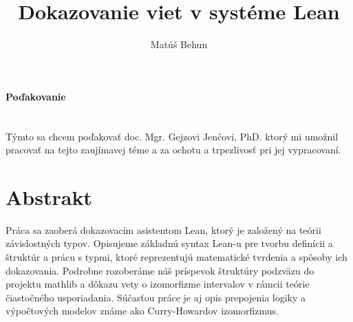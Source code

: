 \documentclass[a4paper,10pt,oneside]{report}%
\author{Mat\'u\v{s} Behun}
\title{Dokazovanie viet v systéme Lean}
\begin{document}
\setlength{\belowdisplayskip}{7pt} \setlength{\belowdisplayshortskip}{5pt}
\setlength{\abovedisplayskip}{7pt} \setlength{\abovedisplayshortskip}{5pt}





\newpage

 

\newpage
\paragraph{Poďakovanie} ~\\
\vskip 0.5cm
Týmto sa chcem poďakovať doc. Mgr. Gejzovi Jenčovi, PhD. ktorý mi umožnil pracovať
na tejto zaujímavej téme a za ochotu a trpezlivosť pri jej vypracovaní.

\newpage

\newpage

\section{Abstrakt}

    Práca sa zaoberá dokazovacím asistentom Lean, ktorý je založený na teórii
závislostných typov.
    Opisujeme základnú syntax Lean-u pre tvorbu definícii a štruktúr a prácu s typmi,
ktoré reprezentujú matematické tvrdenia a spôsoby ich dokazovania.
    Podrobne rozoberáme náš príspevok štruktúry podzväzu do projektu mathlib a
dôkazu vety o izomorfizme intervalov v rámcii teórie čiastočného usporiadania.
    Súčasťou práce je aj opis prepojenia logiky a výpočtových modelov známe ako
Curry-Howardov izomorfizmus.
\end{document}
